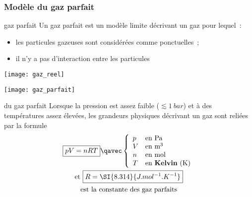 \documentclass[../main/main.tex]{subfiles}
\begin{document}
\subsubsection{Modèle du gaz parfait}

\begin{tcbraster}[raster columns=2, raster equal height=rows]
    \begin{defi}[label=def:gp]{gaz parfait}
        Un gaz parfait est un modèle limite décrivant un gaz pour lequel~:
        \begin{itemize}
            \item les particules gazeuses sont considérées comme ponctuelles~;
            \item il n'y a pas d'interaction entre les particules
        \end{itemize}
        \begin{minipage}{0.49\linewidth}
            \centering
            \texttt{[image: gaz\_reel]}
        \end{minipage}
        \begin{minipage}{0.49\linewidth}
            \centering
            \texttt{[image: gaz\_parfait]}
        \end{minipage}
    \end{defi}
    \begin{loi}[label=loi:gp]{du gaz parfait}
        Lorsque la pression est assez faible ($\lesssim \SI{1}{bar}$) et à des
        températures assez élevées, les grandeurs physiques décrivant un gaz
        sont reliées par la formule
        \begin{gather*}
            \boxed{pV = nRT}
            \qavec
            \left\{
                \begin{array}{ll}
                    p & \text{en Pa }\\
                    V & \text{en m}^3\\
                    n & \text{en mol}\\
                    T & \text{en \textbf{Kelvin} (K)}
                \end{array}
            \right.\\
            \text{et }
            \boxed{R = \SI{8.314}{J.mol^{-1}.K^{-1}}}\\
            \text{est la constante des gaz parfaits}
        \end{gather*}
    \end{loi}
\end{tcbraster}
\end{document}
